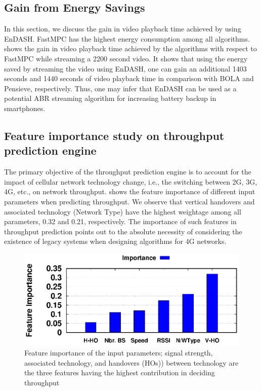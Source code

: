 \subsection{Gain from Energy Savings}
\indent In this section, we discuss the gain in video playback time achieved by using EnDASH. FastMPC has the highest energy consumption among all algorithms. \fig{\ref{fig:vid_time_save}} shows the gain in video playback time achieved by the algorithms with respect to FastMPC while streaming a 2200 second video. It shows that using the energy saved by streaming the video using EnDASH, one can gain an additional 1403 seconds and 1440 seconds of video playback time in comparison with BOLA and Pensieve, respectively. Thus, one may infer that EnDASH can be used as a potential ABR streaming algorithm for increasing battery backup in smartphones.
\subsection{Feature importance study on throughput prediction engine} The primary objective of the throughput prediction engine is to account for the impact of cellular network technology change, i.e., the switching between 2G, 3G, 4G, etc., on network throughput.
\fig{\ref{fig:feature_imp}} shows the feature importance of different input parameters when predicting throughput. We observe that vertical handovers and associated technology (Network Type) have the highest weightage among all parameters, 0.32 and 0.21, respectively. The importance of such features in throughput prediction points out to
the absolute necessity of considering the existence of legacy systems when designing algorithms for 4G networks. 

\begin{figure}[!ht]
    \centering
    \includegraphics[width=0.7\linewidth]{new_results/simres/FeatureImpotance}
    \caption{Feature importance of the input parameters; signal strength, associated technology, and handovers (HOs)) between technology are the three features having the highest contribution in deciding throughput}
    \label{fig:feature_imp}
\end{figure}

